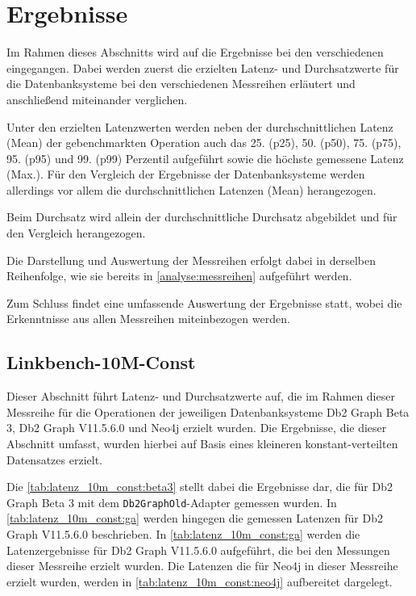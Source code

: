 \chapter{Ergebnisse}
\label{ergebnisse}

Im Rahmen dieses Abschnitts wird auf die Ergebnisse bei den verschiedenen  eingegangen. Dabei werden zuerst die erzielten Latenz- und Durchsatzwerte für die Datenbanksysteme bei den verschiedenen Messreihen erläutert und anschließend miteinander verglichen. 

Unter den erzielten Latenzwerten werden neben der durchschnittlichen Latenz (Mean) der gebenchmarkten Operation auch das 25. (p25), 50. (p50), 75. (p75), 95. (p95) und 99. (p99) Perzentil aufgeführt sowie die höchste gemessene Latenz (Max.). Für den Vergleich der Ergebnisse der Datenbanksysteme werden allerdings vor allem die durchschnittlichen Latenzen (Mean) herangezogen. 

Beim Durchsatz wird allein der durchschnittliche Durchsatz abgebildet und für den Vergleich herangezogen. 

Die Darstellung und Auswertung der Messreihen erfolgt dabei in derselben Reihenfolge, wie sie bereits in \autoref{analyse:messreihen} aufgeführt werden. 

Zum Schluss findet eine umfassende Auswertung der Ergebnisse statt, wobei die Erkenntnisse aus allen Messreihen miteinbezogen werden. 

\section{Linkbench-10M-Const}
\label{ergebnisse:10m_const}
Dieser Abschnitt führt Latenz- und Durchsatzwerte auf, die im Rahmen dieser Messreihe für die Operationen der jeweiligen Datenbanksysteme Db2 Graph Beta 3, Db2 Graph V11.5.6.0 und Neo4j erzielt wurden. Die Ergebnisse, die dieser Abschnitt umfasst, wurden hierbei auf Basis eines kleineren konstant-verteilten Datensatzes erzielt. 

Die \autoref{tab:latenz_10m_const:beta3} stellt dabei die Ergebnisse dar, die für Db2 Graph Beta 3 mit dem \texttt{Db2GraphOld}-Adapter gemessen wurden. In \autoref{tab:latenz_10m_const:ga} werden hingegen die gemessen Latenzen für Db2 Graph V11.5.6.0 beschrieben. In \autoref{tab:latenz_10m_const:ga} werden die Latenzergebnisse für Db2 Graph V11.5.6.0 aufgeführt, die bei den Messungen dieser Messreihe erzielt wurden. Die Latenzen die für Neo4j in dieser Messreihe erzielt wurden, werden in \autoref{tab:latenz_10m_const:neo4j} aufbereitet dargelegt. 

